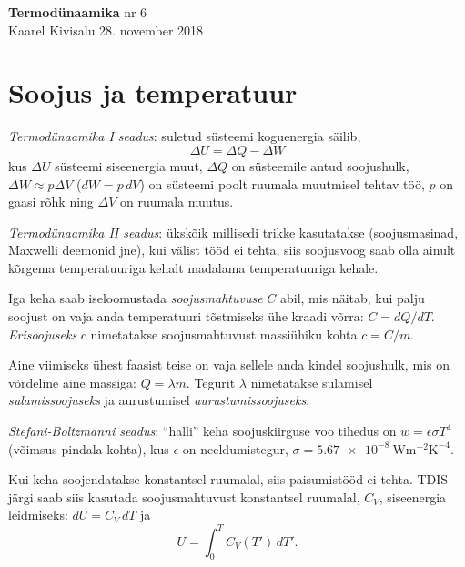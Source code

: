 \documentclass[a4paper,11pt,twocolumn]{article}
\begin{document}
{\huge \textbf{Termodünaamika} \hfill \normalsize {nr 6}} \\
{Kaarel Kivisalu \hfill 28. november 2018}

\section{Soojus ja temperatuur}
\textit{Termodünaamika I seadus}: suletud süsteemi koguenergia säilib,
\[ \Delta U=\Delta Q-\Delta W\]
kus \( \Delta U \) süsteemi siseenergia muut, \( \Delta Q \) on süsteemile antud
soojushulk, \( \Delta W \approx p\Delta V \) (\( dW=p\,dV \)) on süsteemi poolt ruumala muutmisel tehtav töö, \( p \) on gaasi rõhk ning \( \Delta V \) on ruumala muutus.

\textit{Termodünaamika II seadus}: ükskõik millisedi trikke kasutatakse (soojusmasinad, Maxwelli deemonid jne), kui välist tööd ei tehta, siis soojusvoog saab olla ainult kõrgema temperatuuriga kehalt madalama temperatuuriga kehale.

Iga keha saab iseloomustada \textit{soojusmahtuvuse} \( C \) abil,
mis näitab, kui palju soojust on vaja anda temperatuuri tõstmiseks ühe kraadi võrra: \( C = dQ/dT \). \textit{Erisoojuseks} \( c \) nimetatakse soojusmahtuvust massiühiku kohta \( c=C/m \).

Aine viimiseks ühest faasist teise on vaja sellele anda kindel soojushulk, mis on võrdeline aine massiga: \( Q=\lambda m \). Tegurit \( \lambda \) nimetatakse sulamisel \textit{sulamissoojuseks} ja aurustumisel \textit{aurustumissoojuseks}.

\textit{Stefani-Boltzmanni seadus}: \enquote{halli} keha soojuskiirguse voo tihedus on \( w=\epsilon\sigma T^4 \) (võimsus pindala kohta), kus \( \epsilon \) on neeldumistegur, \( \sigma = \SI{5,67e-8}{\watt\metre\tothe{-2}\kelvin\tothe{-4}} \).

Kui keha soojendatakse konstantsel ruumalal, siis paisumistööd ei tehta. TDIS järgi saab siis kasutada soojusmahtuvust konstantsel ruumalal, \( C_V \), siseenergia leidmiseks: \( dU=C_V\,dT \) ja \[ U=\int_{0}^{T}C_V(T')\, dT' .\]
\end{document}
